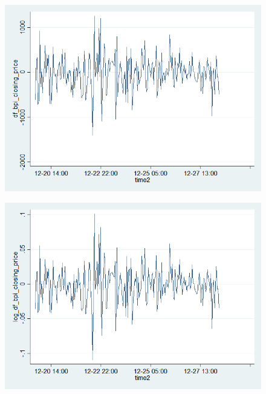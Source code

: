 \documentclass[a4paper,american,12pt]{article}
\begin{document}
\begin{spacing}{1.2}
	\begin{figure}[H]
	\graphicspath{ {stata_export_graphs/} }
	\includegraphics[scale=0.45]{graph_plot_df_bpi.png}
	\end{figure}
	
	\begin{figure}[H]
	\graphicspath{ {stata_export_graphs/} }
	\includegraphics[scale=0.45]{graph_plot_log_df_bpi.png}
	\end{figure}
	
\clearpage


\end{spacing}
\end{document}
